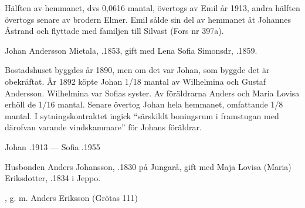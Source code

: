 Hälften av hemmanet, dvs 0,0616 mantal, övertogs av Emil år 1913, andra hälften övertogs senare av brodern Elmer. Emil sålde sin del av hemmanet åt Johannes Åstrand och flyttade med familjen till Silvast (Fors nr 397a).


Johan Andersson Mietala, .1853, gift med Lena Sofia Simonsdr, .1859.
\begin{jhchildren}
  \item {}
  \item {}
  \item {}
  \item {}
  \item {}
  \item {}
  \item {}
  \item {}
\end{jhchildren}

Bostadshuset byggdes år 1890, men om det var Johan, som byggde det är obekräftat. År 1892 köpte Johan 1/18 mantal av Wilhelmina och Gustaf Andersson. Wilhelmina var Sofias syster. Av föräldrarna Anders och Maria Lovisa erhöll de 1/16 mantal. Senare övertog Johan hela hemmanet, omfattande 1/8 mantal. I sytningskontraktet ingick ``särskildt boningsrum i framstugan med därofvan varande vindskammare'' för Johans föräldrar.

Johan .1913  ---  Sofia .1955


Husbonden Anders Johansson,  .1830 på Jungarå, gift med Maja Lovisa (Maria) Eriksdotter, .1834 i Jeppo.
\begin{jhchildren}
  \item {}
  \item {}
  \item {}
  \item {}
  \item {}
  \item {}, g. m. Anders Eriksson (Grötas 111)
  \item {}
\end{jhchildren}

